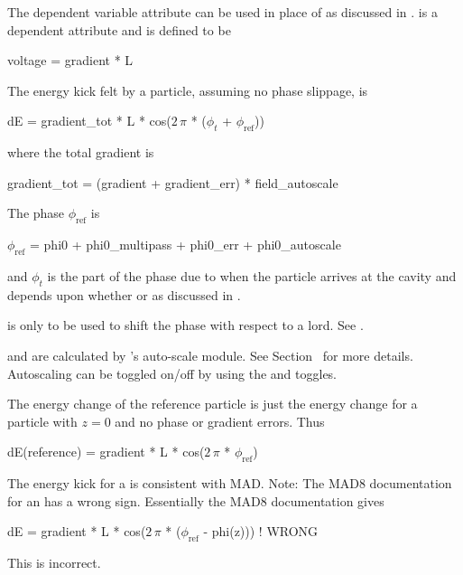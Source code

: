 The dependent variable  attribute can be used in place of
 as discussed in .   is a
dependent attribute and is defined to be
\begin{example}
  voltage = gradient * L
\end{example}

The energy kick felt by a particle, assuming no phase slippage, is 
\begin{example}
  dE = gradient_tot * L * cos(\(2\,\pi\) * (\(\phi_t\) + \(\phi_\text{ref}\)))
\end{example}
where the total gradient is
\begin{example}
  gradient_tot = (gradient + gradient_err) * field_autoscale
\end{example}
The phase $\phi_{\text{ref}}$ is
\begin{example}
  \(\phi_{\text{ref}}\) = phi0 + phi0_multipass + phi0_err + phi0_autoscale
\end{example}
and $\phi_t$ is the part of the phase due to when the particle arrives
at the cavity and depends upon whether  or 
 as discussed in .

 is only to be used to shift the phase with respect to a
 lord. See .

 and  are calculated by \bmad's auto-scale
module. See Section~ for more details. Autoscaling can be toggled on/off
by using the  and  toggles.

The energy change of the reference particle is just the energy change for a 
particle with $z = 0$ and no phase or gradient errors. Thus
\begin{example}
  dE(reference) = gradient * L * cos(\(2\,\pi\) * \(\phi_{\text{ref}}\))
\end{example}

The energy kick for a \bmad {} is consistent with MAD. 
Note: The MAD8 documentation for an  has a wrong
sign. Essentially the MAD8 documentation gives
\begin{example}
  dE = gradient * L * cos(\(2\,\pi\) * (\(\phi_{\text{ref}}\) - phi(z))) ! WRONG
\end{example}
This is incorrect. 

